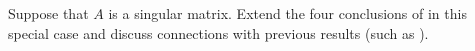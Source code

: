 Suppose that $A$ is a singular matrix.  Extend the four conclusions of  in this special case and discuss connections with previous results (such as ).